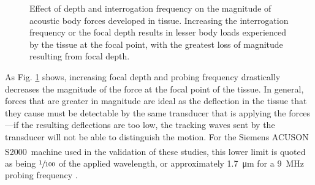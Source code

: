 			\begin{figure}[!htb]
				\centering
				\caption[Effect of depth and interrogation frequency on magnitude of acoustic body forces]{Effect of depth and interrogation frequency on the magnitude of acoustic body forces developed in tissue. Increasing the interrogation frequency or the focal depth results in lesser body loads experienced by the tissue at the focal point, with the greatest loss of magnitude resulting from focal depth.}
				\label{fig:freq-depth-force}
			\end{figure}

			As Fig. \ref{fig:freq-depth-force} shows, increasing focal depth and probing frequency drastically decreases the magnitude of the force at the focal point of the tissue. In general, forces that are greater in magnitude are ideal as the deflection in the tissue that they cause must be detectable by the same transducer that is applying the forces---if the resulting deflections are too low, the tracking waves sent by the transducer will not be able to distinguish the motion. For the Siemens ACUSON S2000\textsuperscript{\texttrademark}\ machine used in the validation of these studies, this lower limit is quoted as being $\sfrac{1}{100}$ of the applied wavelength, or approximately \SI{1.7}{\um} for a \SI{9}{\MHz} probing frequency \cite{} .

